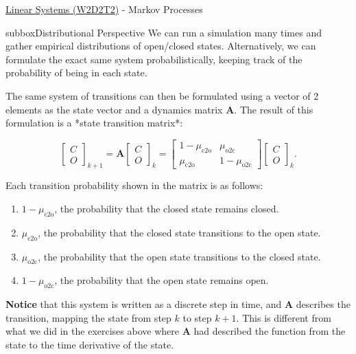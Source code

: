 \begin{textbox}{\href{https://colab.research.google.com/github/NeuromatchAcademy/course-content/blob/master/tutorials/W2D2_LinearSystems/student/W2D2_Tutorial2.ipynb}{Linear Systems (W2D2T2)} -  Markov Processes}
\begin{subbox}{subbox}{Distributional Perspective}
\scriptsize
We can run a simulation many times and gather empirical distributions of open/closed states. Alternatively, we can formulate the exact same system probabilistically, keeping track of the probability of being in each state.

The same system of transitions can then be formulated using a vector of 2 elements as the state vector and a dynamics matrix $\mathbf{A}$. The result of this formulation is a *state transition matrix*:

\[\left[ \begin{array}{c} C \\ O \end{array} \right]_{k+1} = \mathbf{A} \left[ \begin{array}{c} C \\ O \end{array} \right]_k = \left[ \begin{matrix} 1-\mu_{\text{c2o}} & \mu_{\text{o2c}} \\ \mu_{\text{c2o}} & 1-\mu_{\text{o2c}} \end{matrix} \right] \left[ \begin{array}{c} C \\ O \end{array} \right]_k.\]


Each transition probability shown in the matrix is as follows:
\begin{enumerate}
    \item 
 $1-\mu_{\text{c2o}}$, the probability that the closed state remains closed. 
\item $\mu_{\text{c2o}}$, the probability that the closed state transitions to the open state.
\item  $\mu_{\text{o2c}}$, the probability that the open state transitions to the closed state. 
\item $1-\mu_{\text{o2c}}$, the probability that the open state remains open. 
\end{enumerate}



\textbf{Notice} that this system is written as a discrete step in time, and $\mathbf{A}$ describes the transition, mapping the state from step $k$ to step $k+1$. This is different from what we did in the exercises above where $\mathbf{A}$ had described the function from the state to the time derivative of the state.


\end{subbox}
\end{textbox}
